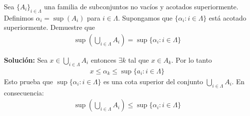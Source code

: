 \documentclass[12pt]{book}
\begin{document}
\begin{prob}{}{}
    Sea $\{ A_i\}_{i \in \Lambda}$ una familia de subconjuntos no vacíos y acotados superiormente. Definimos $\alpha_i=\sup(A_i)$ para $i \in \Lambda$. Supongamos que $\{\alpha_i : i \in \Lambda \}$ está acotado superiormente. Demuestre que 
\begin{align*}
    \sup\left(\bigcup_{i\in \Lambda} A_i \right) = \sup\{\alpha_i :i \in \Lambda \}
\end{align*}
\end{prob}
\textbf{Solución:}
Sea $x \in \bigcup_{i\in \Lambda} A_i$ entonces $\exists k$ tal que $x \in A_k$. Por lo tanto
\begin{align*}
    x \leq \alpha_k \leq \sup\{a_i : i \in \Lambda \} 
\end{align*}
Esto prueba que $\sup\{\alpha_i : i \in \Lambda \}$ es una cota superior del conjunto $\bigcup_{i\in \Lambda} A_i$. En consecuencia:
\begin{align*}
      \sup\left(\bigcup_{i\in \Lambda} A_i \right) \leq \sup\{\alpha_i :i \in \Lambda \}
\end{align*}
\end{document}
